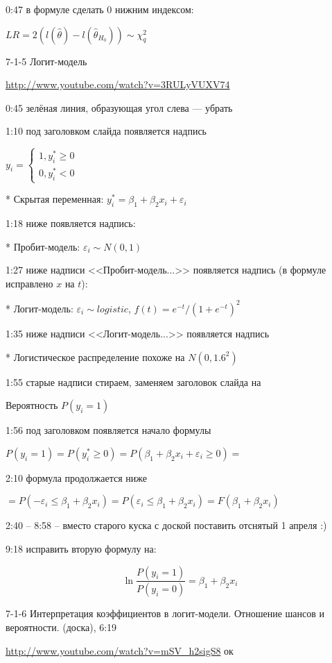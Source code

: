 \documentclass[12pt,a4paper]{article}\usepackage[]{graphicx}\usepackage[]{color}
\newcommand{\e}{\varepsilon}
\begin{document}
0:47 в формуле сделать 0 нижним индексом:

$LR=2(l(\hat{\theta})-l(\hat{\theta}_{H_0})) \sim \chi^2_q$

7-1-5  Логит-модель

\url{http://www.youtube.com/watch?v=3RULyVUXV74}


0:45 зелёная линия, образующая угол слева --- убрать

1:10 под заголовком слайда появляется надпись

$y_i=\begin{cases}
1, y^*_i \geq 0 \\
0, y^*_i <0
\end{cases}$

* Скрытая переменная: $y^*_i=\beta_1 +\beta_2 x_i +\varepsilon_i$

1:18 ниже появляется надпись:

* Пробит-модель: $\varepsilon_i \sim N(0,1)$

1:27 ниже надписи <<Пробит-модель...>> появляется надпись (в формуле исправлено $x$ на $t$):

* Логит-модель: $\varepsilon_i \sim logistic$, $f(t)=e^{-t}/(1+e^{-t})^2$

1:35 ниже надписи <<Логит-модель...>> появляется надпись 

* Логистическое распределение похоже на $N(0,1.6^2)$


1:55 старые надписи стираем, заменяем заголовок слайда на 

Вероятность $P(y_i=1)$

1:56 под заголовком появляется начало формулы

$P(y_i=1)=P(y_i^* \geq 0) = P(\beta_1 + \beta_2 x_i + \e_i \geq 0) =$

2:10 формула продолжается ниже

$=P(-\e_i \leq \beta_1 + \beta_2 x_i  ) = P(\e_i \leq \beta_1 + \beta_2 x_i  )=F(\beta_1 + \beta_2 x_i )$


2:40 -- 8:58 -- вместо старого куска с доской поставить отснятый 1 апреля :)


9:18 исправить вторую формулу на:

\[
\ln \frac{P(y_i=1)}{P(y_i=0)}=\beta_1 +\beta_2 x_i
\]


7-1-6 Интерпретация коэффициентов в логит-модели. Отношение шансов и вероятности. (доска), 6:19

\url{http://www.youtube.com/watch?v=mSV_h2sigS8} ок
\end{document}
